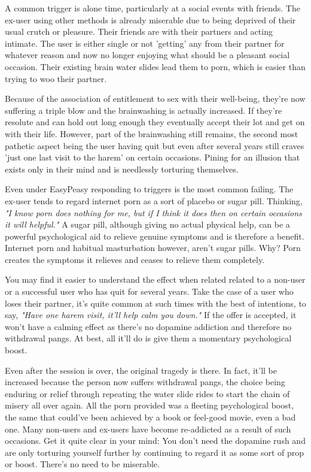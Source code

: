 \documentclass[easypeasy.tex]{subfiles}
\begin{document}
A common trigger is alone time, particularly at a social events with friends. The ex-user using other methods is already miserable due to being deprived of their usual crutch or pleasure. Their friends are with their partners and acting intimate. The user is either single or not 'getting' any from their partner for whatever reason and now no longer enjoying what should be a pleasant social occasion. Their existing brain water slides lead them to porn, which is easier than trying to woo their partner.

Because of the association of entitlement to sex with their well-being, they're now suffering a triple blow and the brainwashing is actually increased. If they're resolute and can hold out long enough they eventually accept their lot and get on with their life. However, part of the brainwashing still remains, the second most pathetic aspect being the user having quit but even after several years still craves 'just one last visit to the harem' on certain occasions. Pining for an illusion that exists only in their mind and is needlessly torturing themselves.

Even under EasyPeasy responding to triggers is the most common failing. The ex-user tends to regard internet porn as a sort of placebo or sugar pill. Thinking, \textit{"I know porn does nothing for me, but if I think it does then on certain occasions it will helpful."} A sugar pill, although giving no actual physical help, can be a powerful psychological aid to relieve genuine symptoms and is therefore a benefit. Internet porn and habitual masturbation however, aren't sugar pills. Why? Porn creates the symptoms it relieves and ceases to relieve them completely.

You may find it easier to understand the effect when related related to a non-user or a successful user who has quit for several years. Take the case of a user who loses their partner, it's quite common at such times with the best of intentions, to say, \textit{"Have one harem visit, it'll help calm you down."} If the offer is accepted, it won't have a calming effect as there's no dopamine addiction and therefore no withdrawal pangs. At best, all it'll do is give them a momentary psychological boost.

Even after the session is over, the original tragedy is there. In fact, it'll be increased because the person now suffers withdrawal pangs, the choice being enduring or relief through repeating the water slide rides to start the chain of misery all over again. All the porn provided was a fleeting psychological boost, the same that could've been achieved by a book or feel-good movie, even a bad one. Many non-users and ex-users have become re-addicted as a result of such occasions. Get it quite clear in your mind: You don't need the dopamine rush and are only torturing yourself further by continuing to regard it as some sort of prop or boost. There's no need to be miserable.
\end{document}
